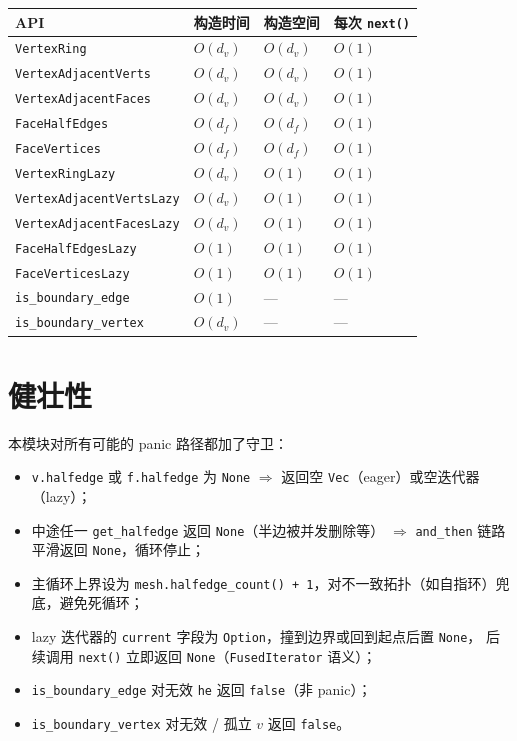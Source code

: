 \documentclass[11pt,a4paper]{article}
\begin{document}
\begin{center}
\renewcommand{\arraystretch}{1.18}
\begin{tabular}{@{}llll@{}}
  \toprule
  \textbf{API} & \textbf{构造时间} & \textbf{构造空间} & \textbf{每次 \texttt{next()}} \\
  \midrule
  \texttt{VertexRing}            & $O(d_v)$ & $O(d_v)$ & $O(1)$ \\
  \texttt{VertexAdjacentVerts}   & $O(d_v)$ & $O(d_v)$ & $O(1)$ \\
  \texttt{VertexAdjacentFaces}   & $O(d_v)$ & $O(d_v)$ & $O(1)$ \\
  \texttt{FaceHalfEdges}         & $O(d_f)$ & $O(d_f)$ & $O(1)$ \\
  \texttt{FaceVertices}          & $O(d_f)$ & $O(d_f)$ & $O(1)$ \\
  \midrule
  \texttt{VertexRingLazy}        & $O(d_v)$ & $O(1)$   & $O(1)$ \\
  \texttt{VertexAdjacentVertsLazy} & $O(d_v)$ & $O(1)$ & $O(1)$ \\
  \texttt{VertexAdjacentFacesLazy} & $O(d_v)$ & $O(1)$ & $O(1)$ \\
  \texttt{FaceHalfEdgesLazy}     & $O(1)$   & $O(1)$   & $O(1)$ \\
  \texttt{FaceVerticesLazy}      & $O(1)$   & $O(1)$   & $O(1)$ \\
  \midrule
  \texttt{is\_boundary\_edge}    & $O(1)$   & --- & --- \\
  \texttt{is\_boundary\_vertex}  & $O(d_v)$ & --- & --- \\
  \bottomrule
\end{tabular}
\end{center}

\section{健壮性}

本模块对所有可能的 panic 路径都加了守卫：

\begin{itemize}
  \item \texttt{v.halfedge} 或 \texttt{f.halfedge} 为 \texttt{None} $\Rightarrow$ 返回空 \texttt{Vec}（eager）或空迭代器（lazy）；
  \item 中途任一 \texttt{get\_halfedge} 返回 \texttt{None}（半边被并发删除等） $\Rightarrow$
        \texttt{and\_then} 链路平滑返回 \texttt{None}，循环停止；
  \item 主循环上界设为 \texttt{mesh.halfedge\_count() + 1}，对不一致拓扑（如自指环）兜底，避免死循环；
  \item lazy 迭代器的 \texttt{current} 字段为 \texttt{Option}，撞到边界或回到起点后置 \texttt{None}，
        后续调用 \texttt{next()} 立即返回 \texttt{None}（\texttt{FusedIterator} 语义）；
  \item \texttt{is\_boundary\_edge} 对无效 \texttt{he} 返回 \texttt{false}（非 panic）；
  \item \texttt{is\_boundary\_vertex} 对无效 / 孤立 $v$ 返回 \texttt{false}。
\end{itemize}
\end{document}
